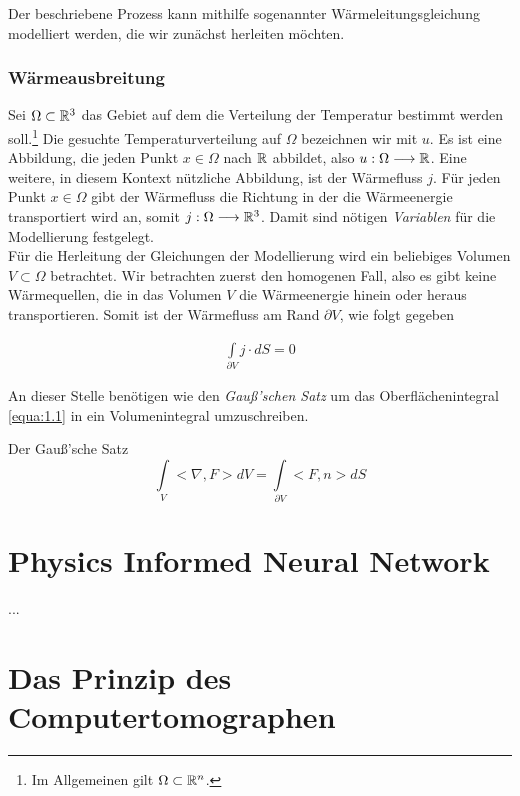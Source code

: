 Der beschriebene Prozess kann mithilfe sogenannter Wärmeleitungsgleichung modelliert werden, die wir zunächst herleiten möchten.

\subsubsection*{Wärmeausbreitung}
Sei $\Omega \subset \mathbb{R}^{3}$ das Gebiet auf dem die Verteilung der Temperatur bestimmt werden soll.\footnote{\label{foot:1.1.1} Im Allgemeinen gilt $\Omega \subset \mathbb{R}^n$.} Die gesuchte Temperaturverteilung auf $\Omega$ bezeichnen wir mit $u$. Es ist eine Abbildung, die jeden Punkt $x \in \Omega$ nach $\mathbb{R}$ abbildet, also $u:\Omega \longrightarrow \mathbb{R}$. Eine weitere, in diesem Kontext nützliche Abbildung, ist der Wärmefluss $j$. Für jeden Punkt $x \in \Omega$ gibt der Wärmefluss die Richtung in der die Wärmeenergie transportiert wird an, somit $j:\Omega \longrightarrow \mathbb{R}^3$. Damit sind nötigen \textit{Variablen} für die Modellierung festgelegt.\\

Für die Herleitung der Gleichungen der Modellierung wird ein beliebiges Volumen $V \subset \Omega$ betrachtet. Wir betrachten zuerst den homogenen Fall, also es gibt keine Wärmequellen, die in das Volumen $V$ die Wärmeenergie hinein oder heraus transportieren. Somit ist der Wärmefluss am Rand $\partial V$, wie folgt gegeben

\begin{eqnarray}
	\int\limits_{\partial V} j \cdot dS = 0
	\label{equa:1.1}
\end{eqnarray}

An dieser Stelle benötigen wie den \textit{Gauß'schen Satz} um das Oberflächenintegral \ref{equa:1.1} in ein Volumenintegral umzuschreiben.

\begin{Definition}
	Der Gauß'sche Satz
	\begin{equation}
		\int\limits_{V} <\nabla,F> dV = \int\limits_{\partial V} <F,n> dS
	\end{equation}
\end{Definition}


\section{Physics Informed Neural Network}

...

\section{Das Prinzip des Computertomographen}
\label{cha:1.1}

